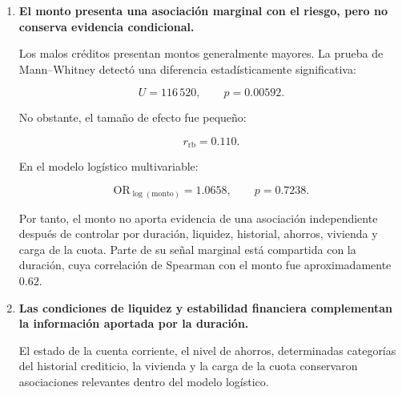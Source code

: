 \begin{enumerate}
    \[
    \mathrm{OR}=1.0390,
    \qquad
    p=0.0008.
    \]

    El análisis mediante Metropolis--Hastings confirmó esta asociación.
    La media posterior del coeficiente fue:

    \[
    \operatorname{E}
    \left[
        \beta_{\mathrm{dur}}
        \mid
        \mathrm{datos}
    \right]
    =
    0.04084,
    \]

    con intervalo creíble:

    \[
    [0.01902,\;0.06275],
    \]

    y:

    \[
    \Pr
    \left(
        \beta_{\mathrm{dur}}>0
        \mid
        \mathrm{datos}
    \right)
    \approx
    1.
    \]

    La consistencia entre la evidencia descriptiva, frecuentista,
    multivariable y bayesiana convierte a la duración en el resultado
    numérico más sólido del estudio.

    \item \textbf{El monto presenta una asociación marginal con el riesgo,
    pero no conserva evidencia condicional.}

    Los malos créditos presentan montos generalmente mayores. La prueba
    de Mann--Whitney detectó una diferencia estadísticamente significativa:

    \[
    U=116\,520,
    \qquad
    p=0.00592.
    \]

    No obstante, el tamaño de efecto fue pequeño:

    \[
    r_{\mathrm{rb}}=0.110.
    \]

    En el modelo logístico multivariable:

    \[
    \mathrm{OR}_{\log(\mathrm{monto})}
    =
    1.0658,
    \qquad
    p=0.7238.
    \]

    Por tanto, el monto no aporta evidencia de una asociación independiente
    después de controlar por duración, liquidez, historial, ahorros,
    vivienda y carga de la cuota. Parte de su señal marginal está
    compartida con la duración, cuya correlación de Spearman con el monto
    fue aproximadamente \(0.62\).

    \item \textbf{Las condiciones de liquidez y estabilidad financiera
    complementan la información aportada por la duración.}

    El estado de la cuenta corriente, el nivel de ahorros, determinadas
    categorías del historial crediticio, la vivienda y la carga de la
    cuota conservaron asociaciones relevantes dentro del modelo
    logístico.


\end{enumerate}
